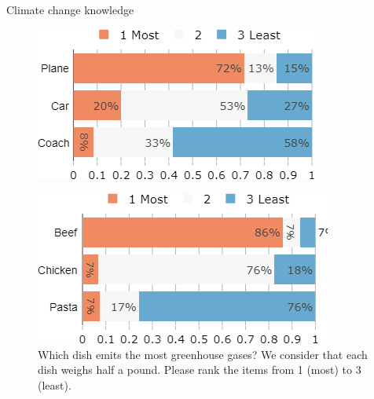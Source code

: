 \documentclass[aspectratio=169,9pt,dvipsnames]{beamer}
\begin{document}
\begin{frame}{Climate change knowledge}%
\begin{figure}[h!]
\centering
\caption{If a family of 4 travels 700 km from Copenhagen to Stockholm, with which mode of transportation do they emit the most greenhouse gases? %
Please rank the items from 1 (most) to 3 (least).}
\includegraphics[width=.3\textwidth]{../figures/DK/footprint_transport_DK.png} \\
\centering
\caption{Which dish emits the most greenhouse gases? We consider that each dish weighs half a pound.
Please rank the items from 1 (most) to 3 (least).}
\includegraphics[width=.3\textwidth]{../figures/DK/footprint_food_DK.png}
\end{figure}
\end{frame}
\end{document}
